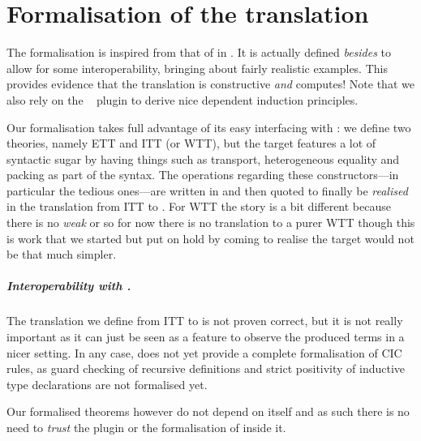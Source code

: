 \chapter{Formalisation of the translation}

The formalisation is inspired from that of \Coq in \MetaCoq. It is actually
defined \emph{besides} \MetaCoq to allow for some interoperability, bringing
about fairly realistic examples.
This provides evidence that the translation is constructive \emph{and} computes!
Note that we also rely on the
\Equations~ plugin to
derive nice dependent induction principles.

Our formalisation takes full advantage of its easy interfacing with \MetaCoq:
we define two theories, namely \acrshort{ETT} and \acrshort{ITT}
(or \acrshort{WTT}), but the target features a lot of syntactic
sugar by having things such as transport, heterogeneous equality and packing as
part of the syntax. The operations regarding these constructors---in particular
the tedious ones---are written in \Coq and then quoted to finally be
\emph{realised} in the translation from \acrshort{ITT} to \MetaCoq.
For \acrshort{WTT} the story is a bit different because there is no \emph{weak}
\Coq or \MetaCoq so for now there is no translation to a purer \acrshort{WTT}
though this is work that we started but put on hold by coming to realise the
target would not be that much simpler.

\paragraph{Interoperability with \MetaCoq.}
The translation we define from \acrshort{ITT} to \MetaCoq is not proven
correct, but it is not really important as it can just be seen as a
feature to observe the produced terms in a nicer setting.
In any case, \MetaCoq does not yet provide a complete formalisation of
\acrshort{CIC} rules, as guard checking of recursive definitions and strict
positivity of inductive type declarations are not formalised yet.

Our formalised theorems however do not depend on \MetaCoq itself and as such
there is no need to \emph{trust} the plugin or the formalisation of \Coq inside
it.

